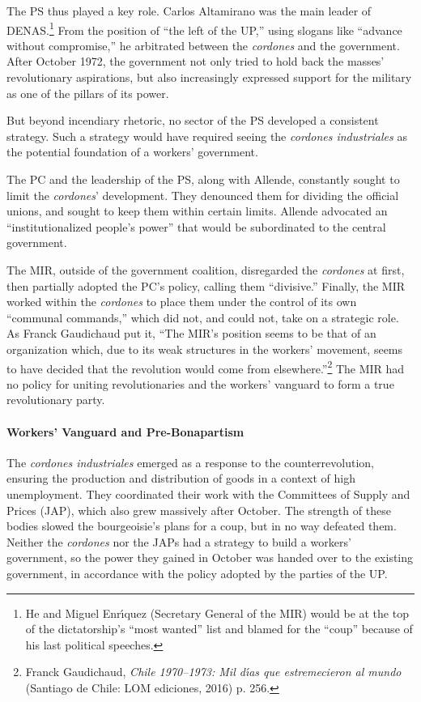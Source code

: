 The PS thus played a key role. Carlos Altamirano was the main leader of DENAS.\footnote{He and Miguel Enr\'{\i}quez (Secretary General of the MIR) would be at the top of the dictatorship's ``most wanted'' list and blamed for the ``coup'' because of his last political speeches.} From the position of ``the left of the UP,'' using slogans like ``advance without compromise,'' he arbitrated between the \emph{cordones} and the government. After October 1972, the government not only tried to hold back the masses' revolutionary aspirations, but also increasingly expressed support for the military as one of the pillars of its power.

But beyond incendiary rhetoric, no sector of the PS developed a consistent strategy. Such a strategy would have required seeing the \emph{cordones industriales} as the potential foundation of a workers' government.

The PC and the leadership of the PS, along with Allende, constantly sought to limit the \emph{cordones}' development. They denounced them for dividing the official unions, and sought to keep them within certain limits. Allende advocated an ``institutionalized people's power'' that would be subordinated to the central government.

The MIR, outside of the government coalition, disregarded the \emph{cordones} at first, then partially adopted the PC's policy, calling them ``divisive.'' Finally, the MIR worked within the \emph{cordones} to place them under the control of its own ``communal commands,'' which did not, and could not, take on a strategic role. As Franck Gaudichaud put it, ``The MIR's position seems to be that of an organization which, due to its weak structures in the workers' movement, seems to have decided that the revolution would come from elsewhere.''\footnote{Franck Gaudichaud, \emph{Chile 1970--1973: Mil d\'{\i}as que estremecieron al mundo} (Santiago de Chile: LOM ediciones, 2016) p. 256.} The MIR had no policy for uniting revolutionaries and the workers' vanguard to form a true revolutionary party.

\paragraph{Workers' Vanguard and Pre-Bonapartism}

The \emph{cordones industriales} emerged as a response to the counterrevolution, ensuring the production and distribution of goods in a context of high unemployment. They coordinated their work with the Committees of Supply and Prices (JAP), which also grew massively after October. The strength of these bodies slowed the bourgeoisie's plans for a coup, but in no way defeated them. Neither the \emph{cordones} nor the JAPs had a strategy to build a workers' government, so the power they gained in October was handed over to the existing government, in accordance with the policy adopted by the parties of the UP.

